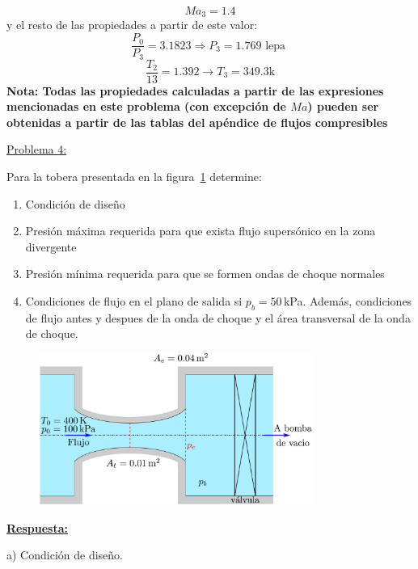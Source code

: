 \documentclass[11pt]{report}
\begin{document}
$$
{Ma}_{3}=1.4
$$
y el resto de las propiedades a partir de este valor:
$$
\frac{P_{0}}{P_{3}}=3.1823 \Rightarrow P_{3}=1.769 \text { lepa }
$$
$$
\frac{T_{2}}{13}=1.392 \rightarrow T_{3}=349.3 \mathrm{k}
$$
\textbf{Nota: Todas las propiedades calculadas a partir de las expresiones mencionadas en este problema (con excepci\'on de $Ma$) pueden ser obtenidas a partir de las tablas del ap\'endice de flujos compresibles}

\newpage
\underline {Problema 4:}
\vspace{0.2cm}

Para la tobera presentada en la figura~\ref{fig:fig3} determine:
\begin{enumerate}
\item Condici\'on de diseño
\item Presi\'on m\'axima requerida para que exista flujo supers\'onico en la zona divergente
\item Presi\'on m\'inima requerida para que se formen ondas de choque normales
\item Condiciones de flujo en el plano de salida si $p_b=50$\,kPa. Adem\'as, condiciones de flujo antes y despues de la onda de choque y el \'area transversal de la onda de choque.
\end{enumerate}

\begin{figure}[H]
\centering\includegraphics[width=0.8\textwidth]{Figures/tobera_convdiv.eps}
\caption{\label{fig:fig3} }
\end{figure}

\vspace{0.2cm}

\underline{\textbf{Respuesta:}}


a) Condici\'on de diseño.
\end{document}
